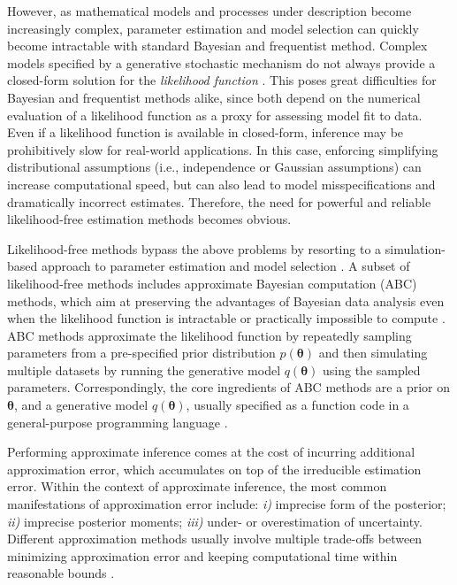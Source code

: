 \documentclass[9pt,twoside,lineno]{pnas-new}
\begin{document}
However, as mathematical models and processes under description become increasingly complex, parameter estimation and model selection can quickly become intractable with standard Bayesian and frequentist method. Complex models specified by a generative stochastic mechanism do not always provide a closed-form solution for the \textit{likelihood function} \cite{palestro2018likelihood, csillery2010approximate, toni2009simulation}. This poses great difficulties for Bayesian and frequentist methods alike, since both depend on the numerical evaluation of a likelihood function as a proxy for assessing model fit to data. Even if a likelihood function is available in closed-form, inference may be prohibitively slow for real-world applications. In this case, enforcing simplifying distributional assumptions (i.e., independence or Gaussian assumptions) can increase computational speed, but can also lead to model misspecifications and dramatically incorrect estimates. Therefore, the need for powerful and reliable likelihood-free estimation methods becomes obvious. 

Likelihood-free methods bypass the above problems by resorting to a simulation-based approach to parameter estimation and model selection \cite{palestro2018likelihood, turner2014generalized}. A subset of likelihood-free methods includes approximate Bayesian computation (ABC) methods, which aim at preserving the advantages of Bayesian data analysis even when the likelihood function is intractable or practically impossible to compute \cite{turner2014generalized, sunnaaker2013approximate, csillery2010approximate}. ABC methods approximate the likelihood function by repeatedly sampling parameters from a pre-specified prior distribution $p(\boldsymbol{\theta})$ and then simulating multiple datasets by running the generative model $q(\boldsymbol{\theta})$ using the sampled parameters. Correspondingly, the core ingredients of ABC methods are a prior on $\boldsymbol{\theta}$, and a generative model $q(\boldsymbol{\theta})$, usually specified as a function code in a general-purpose programming language \cite{csillery2010approximate, mertens2018abrox}.

Performing approximate inference comes at the cost of incurring additional approximation error, which accumulates on top of the irreducible estimation error. Within the context of approximate inference, the most common manifestations of approximation error include: \textit{i)} imprecise form of the posterior; \textit{ii)} imprecise posterior moments; \textit{iii)} under- or overestimation of uncertainty. Different approximation methods usually involve multiple trade-offs between minimizing approximation error and keeping computational time within reasonable bounds \cite{frazier2018asymptotic, palestro2018likelihood}.
\end{document}
